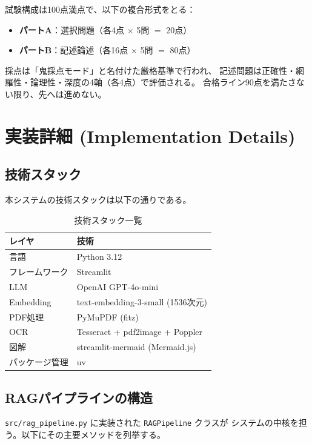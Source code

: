 \documentclass[uplatex, dvipdfmx, a4paper, 11pt]{jsarticle}
\begin{document}
試験構成は100点満点で、以下の複合形式をとる：
\begin{itemize}
    \item \textbf{パートA}：選択問題（各4点 $\times$ 5問 $=$ 20点）
    \item \textbf{パートB}：記述論述（各16点 $\times$ 5問 $=$ 80点）
\end{itemize}

採点は「鬼採点モード」と名付けた厳格基準で行われ、
記述問題は正確性・網羅性・論理性・深度の4軸（各4点）で評価される。
合格ライン90点を満たさない限り、先へは進めない。


\section{実装詳細 (Implementation Details)}

\subsection{技術スタック}
本システムの技術スタックは以下の通りである。

\begin{table}[H]
\centering
\begin{tabular}{ll}
\hline
\textbf{レイヤ} & \textbf{技術} \\
\hline
言語 & Python 3.12 \\
フレームワーク & Streamlit \\
LLM & OpenAI GPT-4o-mini \\
Embedding & text-embedding-3-small (1536次元) \\
PDF処理 & PyMuPDF (fitz) \\
OCR & Tesseract + pdf2image + Poppler \\
図解 & streamlit-mermaid (Mermaid.js) \\
パッケージ管理 & uv \\
\hline
\end{tabular}
\caption{技術スタック一覧}
\label{tab:stack}
\end{table}

\subsection{RAGパイプラインの構造}
\texttt{src/rag\_pipeline.py} に実装された \texttt{RAGPipeline} クラスが
システムの中核を担う。以下にその主要メソッドを列挙する。
\end{document}
